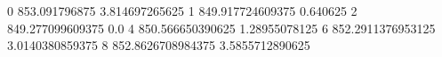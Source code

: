 0 853.091796875 3.814697265625
1 849.917724609375 0.640625
2 849.277099609375 0.0
4 850.566650390625 1.28955078125
6 852.2911376953125 3.0140380859375
8 852.8626708984375 3.5855712890625
